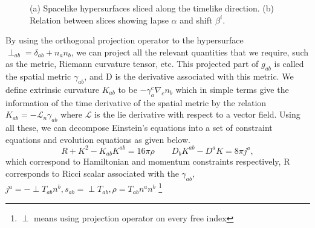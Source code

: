 \begin{figure}
\begin{minipage}{0.38\textwidth}

\end{minipage}

\caption{
(a) Spacelike hypersurfaces sliced along the timelike direction. 
(b) Relation between slices showing lapse $\alpha$ and shift $\beta^i$. \cite{adhikari2025gr}}
\end{figure}

By using the orthogonal projection operator to the hypersurface $\perp_{ab} = \delta_{ab} +n_a n_b$, we can project all the relevant quantities that we require, such as the metric, Riemann curvature tensor, etc. This projected part of $g_{ab}$ is called the spatial metric $\gamma_{ab}$, and D is the derivative associated with this metric. We define extrinsic curvature $K_{ab}$ to be $-\gamma^c_a \nabla_c n_b$ which in simple terms give the information of the time derivative of the spatial metric by the relation $K_{ab} = -\mathcal{L}_n \gamma_{ab}$ where $\mathcal{L}$ is the lie derivative with respect to a vector field. Using all these, we can decompose Einstein's equations into a set of constraint equations and evolution equations as given below.
\begin{equation}
\label{eq:Constraints}
R + K^2 - K_{ab} K^{ab} = 16\pi \rho 
\qquad
D_b K^{ab} - D^a K = 8\pi j^a,
\end{equation}
which correspond to Hamiltonian and momentum constraints respectively, R corresponds to Ricci scalar associated with the $\gamma_{ab}$, $j^a =- \perp T_{ab}n^b, s_{ab}= \perp T_{ab}, \mathcal{\rho} =T_{ab}n^a n^b $ \footnote{$\perp$ means using projection operator on every free index}

